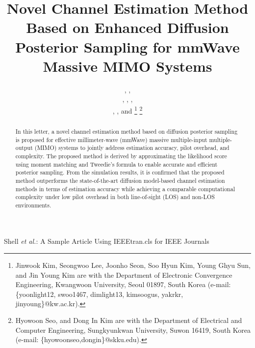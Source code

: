 \documentclass[lettersize,journal]{IEEEtran}
\begin{document}
\title{Novel Channel Estimation Method Based on Enhanced Diffusion Posterior Sampling for mmWave Massive MIMO Systems}

\author{,  ,

, , ,

, , and 
\thanks{Jinwook Kim, Seongwoo Lee, Joonho Seon, Soo Hyun Kim, Young Ghyu Sun, and Jin Young Kim are with the Department of Electronic Convergence Engineering, Kwangwoon University, Seoul 01897, South Korea (e-mail: \{yoonlight12, swoo1467, dimlight13, kimsoogus, yakrkr, jinyoung\}@kw.ac.kr).}
\thanks{Hyowoon Seo, and Dong In Kim are with the Department of Electrical and Computer Engineering, Sungkyunkwan University, Suwon 16419, South Korea (e-mail: \{hyowoonseo,dongin\}@skku.edu).}}


%
{Shell \MakeLowercase{\textit{et al.}}: A Sample Article Using IEEEtran.cls for IEEE Journals}

\maketitle
\begin{abstract}
In this letter, a novel channel estimation method based on diffusion posterior sampling is proposed for effective millimeter-wave (mmWave) massive multiple-input multiple-output (MIMO) systems to jointly address estimation accuracy, pilot overhead, and complexity. The proposed method is derived by approximating the likelihood score using moment matching and Tweedie's formula to enable accurate and efficient posterior sampling. From the simulation results, it is confirmed that the proposed method outperforms the state-of-the-art diffusion model-based channel estimation methods in terms of estimation accuracy while achieving a comparable computational complexity under low pilot overhead in both line-of-sight (LOS) and non-LOS environments.
\end{abstract}
\end{document}
